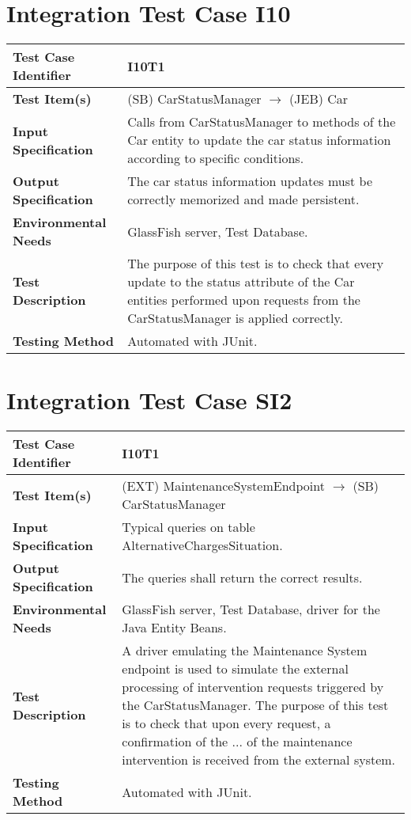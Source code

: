 \section{Integration Test Case I10}

\begin{longtable}{p{} | p{}}
\textbf{Test Case Identifier} & I10T1\\
\hline
\textbf{Test Item(s)} & (SB) CarStatusManager $\rightarrow$ (JEB) Car \\
\hline
\textbf{Input Specification} & Calls from CarStatusManager to methods of the Car entity to update the car status information according to specific conditions.\\
\hline
\textbf{Output Specification} & The car status information updates must be correctly memorized and made persistent. \\
\hline
\textbf{Environmental Needs} & GlassFish server, Test Database. \\
\hline
\textbf{Test Description} & The purpose of this test is to check that every update to the status attribute of the Car entities performed upon requests from the CarStatusManager is applied correctly. \\
\hline
\textbf{Testing Method} & Automated with JUnit. \\
\hline
\end{longtable}



\section{Integration Test Case SI2}

\begin{longtable}{p{} | p{}}
\textbf{Test Case Identifier} & I10T1\\
\hline
\textbf{Test Item(s)} & (EXT) MaintenanceSystemEndpoint $\rightarrow$ (SB) CarStatusManager \\
\hline
\textbf{Input Specification} & Typical queries on table AlternativeChargesSituation. \\
\hline
\textbf{Output Specification} & The queries shall return the correct results. \\
\hline
\textbf{Environmental Needs} & GlassFish server, Test Database, driver for the Java Entity Beans. \\
\hline
\textbf{Test Description} & A driver emulating the Maintenance System endpoint is used to simulate the external processing of intervention requests triggered by the CarStatusManager. The purpose of this test is to check that upon every request, a confirmation of the ... of the maintenance intervention is received from the external system. \\
\hline
\textbf{Testing Method} & Automated with JUnit. \\
\hline
\end{longtable}